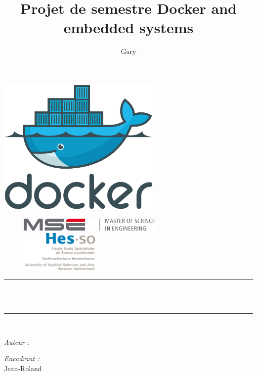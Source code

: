 \documentclass[11pt,a4paper,oneside]{report}
\title{Projet de semestre Docker and embedded systems}
\author{Gary \bsc{Marigliano}}
\begin{document}
\begin{titlepage}
\begin{center}

\includegraphics[width=0.6\textwidth]{img/docker_logo}\\[1cm]

\begin{figure}[htbp]
\begin{minipage}[c]{.45\linewidth}
\begin{flushleft}
\includegraphics[width=7cm]{img/mse_logo}
\end{flushleft}
\end{minipage}
\hfill
\begin{minipage}[c]{.45\linewidth}
\begin{flushright}
\includegraphics[height=2cm]{img/logo_hes-so}
\end{flushright}
\end{minipage}
\end{figure}

\rule{\linewidth}{0.5mm} \\[0.4cm]
{ \huge \bfseries \thetitle \\[0.4cm] }
\rule{\linewidth}{0.5mm} \\[1.5cm]

\noindent
\begin{minipage}{0.4\textwidth}
  \begin{flushleft} \large
    \emph{Auteur :}\\
    \theauthor
  \end{flushleft}
\end{minipage}%
\begin{minipage}{0.4\textwidth}
  \begin{flushright} \large
    \emph{Encadrant :} \\
    Jean-Roland 
  \end{flushright}
\end{minipage}


\end{center}
\end{titlepage}
\end{document}
